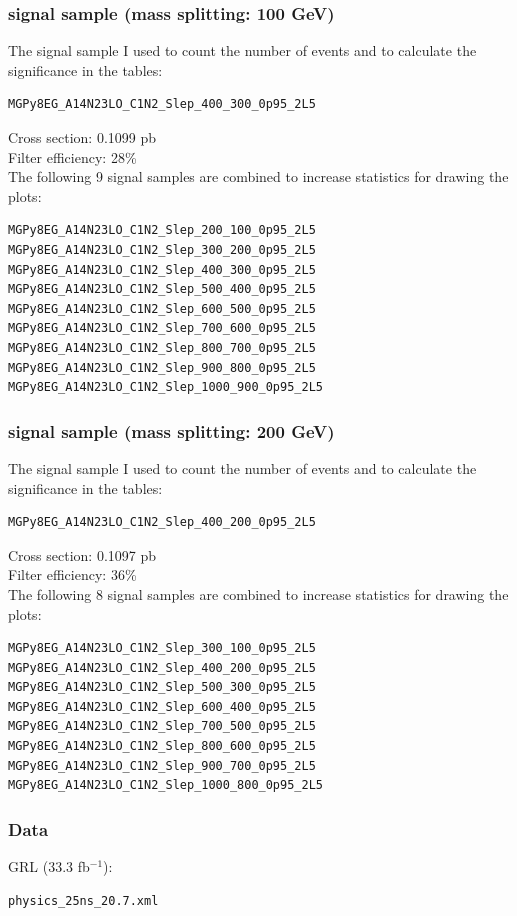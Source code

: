 \documentclass[mathserif,serif]{beamer}
\begin{document}
\begin{frame}[fragile]
\frametitle{signal sample (mass splitting: 100 GeV)}
\small
The signal sample I used to count the number of events and to calculate the significance in the tables:
\tiny
\begin{verbatim}
MGPy8EG_A14N23LO_C1N2_Slep_400_300_0p95_2L5
\end{verbatim}
\small
Cross section: 0.1099 pb \\
Filter efficiency: 28\% \\
\vspace{5mm}
The following 9 signal samples are combined to increase statistics for drawing the plots:
\tiny
\begin{verbatim}
MGPy8EG_A14N23LO_C1N2_Slep_200_100_0p95_2L5
MGPy8EG_A14N23LO_C1N2_Slep_300_200_0p95_2L5
MGPy8EG_A14N23LO_C1N2_Slep_400_300_0p95_2L5
MGPy8EG_A14N23LO_C1N2_Slep_500_400_0p95_2L5
MGPy8EG_A14N23LO_C1N2_Slep_600_500_0p95_2L5
MGPy8EG_A14N23LO_C1N2_Slep_700_600_0p95_2L5
MGPy8EG_A14N23LO_C1N2_Slep_800_700_0p95_2L5
MGPy8EG_A14N23LO_C1N2_Slep_900_800_0p95_2L5
MGPy8EG_A14N23LO_C1N2_Slep_1000_900_0p95_2L5
\end{verbatim}
\end{frame}

\begin{frame}[fragile]
\frametitle{signal sample (mass splitting: 200 GeV)}
\small
The signal sample I used to count the number of events and to calculate the significance in the tables:
\tiny
\begin{verbatim}
MGPy8EG_A14N23LO_C1N2_Slep_400_200_0p95_2L5
\end{verbatim}
\small
Cross section: 0.1097 pb \\
Filter efficiency: 36\% \\
\vspace{5mm}
The following 8 signal samples are combined to increase statistics for drawing the plots:
\tiny
\begin{verbatim}
MGPy8EG_A14N23LO_C1N2_Slep_300_100_0p95_2L5
MGPy8EG_A14N23LO_C1N2_Slep_400_200_0p95_2L5
MGPy8EG_A14N23LO_C1N2_Slep_500_300_0p95_2L5
MGPy8EG_A14N23LO_C1N2_Slep_600_400_0p95_2L5
MGPy8EG_A14N23LO_C1N2_Slep_700_500_0p95_2L5
MGPy8EG_A14N23LO_C1N2_Slep_800_600_0p95_2L5
MGPy8EG_A14N23LO_C1N2_Slep_900_700_0p95_2L5
MGPy8EG_A14N23LO_C1N2_Slep_1000_800_0p95_2L5
\end{verbatim}
\end{frame}

\begin{frame}[fragile]
\frametitle{Data}
\small
GRL (33.3 fb$^{-1}$):\\
\tiny
\begin{verbatim}
physics_25ns_20.7.xml
\end{verbatim}
\end{frame}
\end{document}
